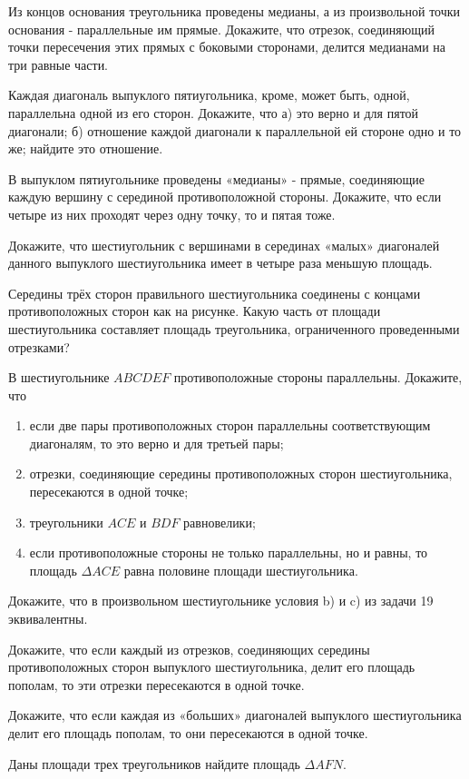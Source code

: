 \documentclass{article}
\begin{document}
\begin{enumerate_boxed}
        \item Из концов основания треугольника проведены медианы, а из произвольной точки основания - параллельные им прямые.
        Докажите, что отрезок, соединяющий точки пересечения этих прямых с боковыми сторонами, делится медианами на три равные части.
        \item Каждая диагональ выпуклого пятиугольника, кроме, может быть, одной, параллельна одной из его сторон.
        Докажите, что а) это верно и для пятой диагонали; б) отношение каждой диагонали к параллельной ей стороне одно и то же; найдите это отношение.
        \item В выпуклом пятиугольнике проведены «медианы» - прямые, соединяющие каждую вершину с серединой противоположной стороны.
        Докажите, что если четыре из них проходят через одну точку, то и пятая тоже.
        \item Докажите, что шестиугольник с вершинами в серединах «малых» диагоналей данного выпуклого шестиугольника имеет в четыре раза меньшую площадь.
        \item Середины трёх сторон правильного шестиугольника соединены с концами противоположных сторон как на рисунке.
        Какую часть от площади шестиугольника составляет площадь треугольника, ограниченного проведенными отрезками?
        \item В шестиугольнике $ABCDEF$ противоположные стороны параллельны.
        Докажите, что
        \begin{enumerate}
            \item если две пары противоположных сторон параллельны соответствующим диагоналям, то это верно и для третьей пары;
            \item отрезки, соединяющие середины противоположных сторон шестиугольника, пересекаются в одной точке;
            \item треугольники $ACE$ и $BDF$ равновелики;
            \item если противоположные стороны не только параллельны, но и равны, то площадь $\Delta ACE$ равна половине площади шестиугольника.
        \end{enumerate}
        \item Докажите, что в произвольном шестиугольнике условия b) и c) из задачи 19 эквивалентны.
        \item Докажите, что если каждый из отрезков, соединяющих середины противоположных сторон выпуклого шестиугольника, делит его площадь пополам, то эти отрезки пересекаются в одной точке.
        \item Докажите, что если каждая из «больших» диагоналей выпуклого шестиугольника делит его площадь пополам, то они пересекаются в одной точке.
        \item Даны площади трех треугольников найдите площадь $\Delta AFN$.


\end{enumerate_boxed}
\end{document}
